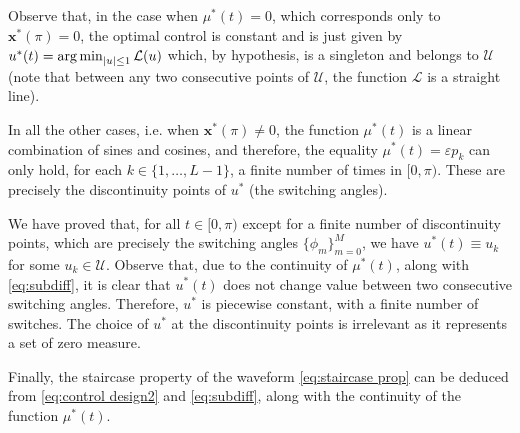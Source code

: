 \documentclass[9pt,shortpaper,twoside,web]{ieeecolor}
\begin{document}
Observe that, in the case when $\mu^\ast(t) = 0$, which corresponds only to $\bm{x}^\ast(\pi) = 0$, the optimal control is constant and is just given by  $u^\ast (t) =  \operatorname*{arg\,min}_{|u|\leq 1} \mathcal{L}(u)$ which, by hypothesis, is a singleton and belongs to $\mathcal{U}$ (note that between any two consecutive points of $\mathcal{U}$, the function $\mathcal{L}$ is a straight line).

In all the other cases,  i.e. when $\bm{x}^\ast(\pi)\neq 0$, the function $\mu^\ast(t)$ is a linear combination of sines and cosines, and therefore, the equality $\mu^\ast (t) = \varepsilon p_k$ can only hold, for each $k\in \{  1, \ldots, L-1 \}$, a finite number of times in $[0,\pi)$. These are precisely the discontinuity points of $u^\ast$ (the switching angles).

We have proved that, for all $t\in [0,\pi)$ except for a finite number of discontinuity points, which are precisely the switching angles $\{\phi_m\}_{m=0}^M$, we have $u^\ast(t)\equiv u_k$ for some $u_k\in\mathcal U$. Observe that, due to the continuity of $\mu^\ast(t)$, along with \eqref{eq:subdiff}, it is clear that $u^\ast(t)$ does not change value between two consecutive switching angles. Therefore, $u^\ast$ is piecewise constant, with a finite number of switches. The choice of $u^\ast$ at the discontinuity points is irrelevant as it represents a set of zero measure.

Finally, the staircase property of the waveform \eqref{eq:staircase prop} can be deduced from \eqref{eq:control design2} and \eqref{eq:subdiff}, along with the continuity of the function $\mu^\ast(t)$. 
\end{document}
